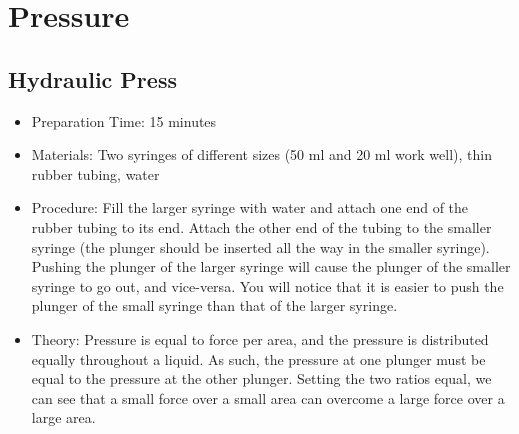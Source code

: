 \section{Pressure}

\subsection{Hydraulic Press}
\begin{itemize}
\item{Preparation Time: 15 minutes}
\item{Materials: Two syringes of different sizes (50 ml and 20 ml work well), thin rubber tubing, water}
\item{Procedure: Fill the larger syringe with water and attach one end of the rubber tubing to its end. Attach the other end of the tubing to the smaller syringe (the plunger should be inserted all the way in the smaller syringe). Pushing the plunger of the larger syringe will cause the plunger of the smaller syringe to go out, and vice-versa. You will notice that it is easier to push the plunger of the small syringe than that of the larger syringe.}
\item{Theory: Pressure is equal to force per area, and the pressure is distributed equally throughout a liquid. As such, the pressure at one plunger must be equal to the pressure at the other plunger. Setting the two ratios equal, we can see that a small force over a small area can overcome a large force over a large area.}
\end{itemize}

